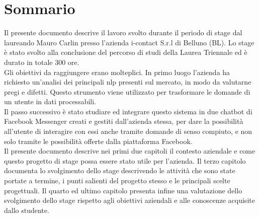
\cleardoublepage
{}
{}
\begingroup
\let\clearpage\relax
\let\cleardoublepage\relax
\let\cleardoublepage\relax

\chapter*{Sommario}

Il presente documento descrive il lavoro svolto durante il periodo di stage dal laureando Mauro Carlin presso l'azienda i-contact S.r.l di Belluno (BL). Lo stage è stato svolto alla conclusione del percorso di studi della Laurea Triennale ed è durato in totale 300 ore.\\
Gli obiettivi da raggiungere erano molteplici. In primo luogo l'azienda ha richiesto un'analisi dei principali \gls{nlp} presenti sul mercato, in modo da valutarne pregi e difetti. Questo strumento viene utilizzato per trasformare le domande di un utente in dati processabili.\\
Il passo successivo è stato studiare ed integrare questo sistema in due chatbot di Facebook Messenger creati e gestiti dall'azienda stessa, per dare la possibilità all'utente di interagire con essi anche tramite domande di senso compiuto, e non solo tramite le possibilità offerte dalla piattaforma Facebook.\\
Il presente documento descrive nei primi due capitoli il contesto aziendale e come questo progetto di stage possa essere stato utile per l'azienda. Il terzo capitolo documenta lo svolgimento dello stage descrivendo le attività che sono state portate a termine, i punti salienti del progetto stesso e le principali scelte progettuali. Il quarto ed ultimo capitolo presenta infine una valutazione dello svolgimento dello stage rispetto agli obiettivi aziendali e alle conoscenze acquisite dallo studente. 

%
%

\endgroup			

\vfill